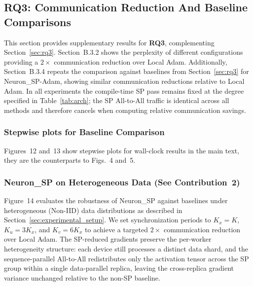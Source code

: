 \documentclass{article}
\begin{document}
\subsection{RQ3: Communication Reduction And Baseline Comparisons}
\label{sec:b3_comm_reduction}

This section provides supplementary results for \textbf{RQ3}, complementing Section~\ref{sec:rq3}. Section~B.3.2 shows the perplexity of different configurations providing a $2\times$ communication reduction over Local Adam. Additionally, Section~B.3.4 repeats the comparison against baselines from Section~\ref{sec:rq3} for Neuron\_SP-Adam, showing similar communication reductions relative to Local Adam. In all experiments the compile-time SP pass remains fixed at the degree specified in Table~\ref{tab:arch}; the SP All-to-All traffic is identical across all methods and therefore cancels when computing relative communication savings.

\subsubsection{Stepwise plots for Baseline Comparison}
\label{sec:b31_stepwise}

Figures~12 and~13 show stepwise plots for wall-clock results in the main text, they are the counterparts to Figs.~4 and~5.


\subsubsection{Neuron\_SP on Heterogeneous Data (See Contribution~2)}
\label{sec:b32_heterogeneous}

Figure~14 evaluates the robustness of Neuron\_SP against baselines under heterogeneous (Non-IID) data distributions as described in Section~\ref{sec:experimental_setup}. We set synchronization periods to $K_x=K$, $K_u=3K_x$, and $K_v=6K_x$ to achieve a targeted $2\times$ communication reduction over Local Adam. The SP-reduced gradients preserve the per-worker heterogeneity structure: each device still processes a distinct data shard, and the sequence-parallel All-to-All redistributes only the activation tensor across the SP group within a single data-parallel replica, leaving the cross-replica gradient variance unchanged relative to the non-SP baseline.
\end{document}
